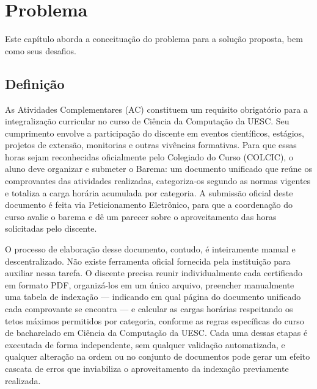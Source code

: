 \chapter{Problema}
\label{cap:problema}
Este capítulo aborda a conceituação do problema para a solução proposta, bem como seus desafios.

\section{Definição}\label{sec:definicao}
As Atividades Complementares (AC) constituem um requisito obrigatório para a integralização curricular no curso de Ciência da Computação da UESC. Seu cumprimento envolve a participação do discente em eventos científicos, estágios, projetos de extensão, monitorias e outras vivências formativas. Para que essas horas sejam reconhecidas oficialmente pelo Colegiado do Curso (COLCIC), o aluno deve organizar e submeter o Barema: um documento unificado que reúne os comprovantes das atividades realizadas, categoriza-os segundo as normas vigentes e totaliza a carga horária acumulada por categoria. A submissão oficial deste documento é feita via Peticionamento Eletrônico, para que a coordenação do curso avalie o barema e dê um parecer sobre o aproveitamento das horas solicitadas pelo discente. 

O processo de elaboração desse documento, contudo, é inteiramente manual e descentralizado. Não existe ferramenta oficial fornecida pela instituição para auxiliar nessa tarefa. O discente precisa reunir individualmente cada certificado em formato PDF, organizá-los em um único arquivo, preencher manualmente uma tabela de indexação — indicando em qual página do documento unificado cada comprovante se encontra — e calcular as cargas horárias respeitando os tetos máximos permitidos por categoria, conforme as regras específicas do curso de bacharelado em Ciência da Computação da UESC. Cada uma dessas etapas é executada de forma independente, sem qualquer validação automatizada, e qualquer alteração na ordem ou no conjunto de documentos pode gerar um efeito cascata de erros que inviabiliza o aproveitamento da indexação previamente realizada.

